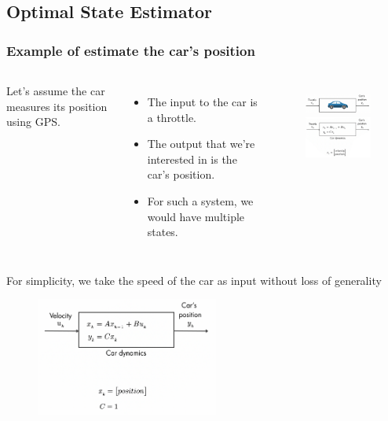 \documentclass{beamer}
\begin{document}
\subsection{Optimal State Estimator}

\begin{frame}
	\frametitle{Example of estimate the car's position}
	\begin{columns}
		Let's assume the car measures its position using GPS.
			\begin{itemize}
				\item The input to the car is a throttle. 
				\item The output that we're interested in is the car's position. 
				\item  For such a system, we would have multiple states. 
			\end{itemize}

			\begin{figure}
				\centering
				\includegraphics[width=5.3cm]{car_pos.png}\\
				\includegraphics[width=5.4cm]{car_dynamic.png}
			\end{figure}
		
	\end{columns}
\end{frame}

\begin{frame}
	For simplicity, we take the speed of the car as input without loss of generality
	\begin{figure}
		\centering
		\includegraphics[width=6cm]{car_vel.png}
	\end{figure}
\end{frame}
\end{document}
